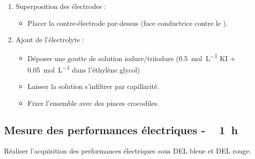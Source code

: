 \documentclass[twoside,a4paper,11pt,addpoints,answers]{exam}%
\begin{document}
\begin{enumerate}
\item Superposition des électrodes :
\begin{itemize}
\item Placer la contre-électrode par-dessus (face conductrice contre le ).
\end{itemize}

\item Ajout de l’électrolyte :
\begin{itemize}
\item Déposer une goutte de solution iodure/triiodure (\SI{0.5}{\mole\per\liter}  KI + \SI{0,05}{\mole\per\liter}  dans l'éthylène glycol)
\item Laisser la solution s'infiltrer par capillarité.
\item Fixer l’ensemble avec des pinces crocodiles.
\end{itemize}
\end{enumerate}

\subsection{Mesure des performances électriques - \faClockO ~ \SI{1}{\hour}}

Réaliser l'acquisition des performances électriques sous DEL bleue et DEL rouge.

\end{document}

